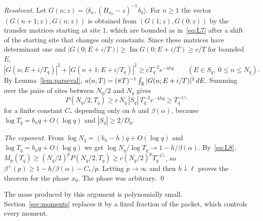 \emph{Resolvent.} Let $G(n;z)=\langle\delta_n,(H_{x_0}-z)^{-1}\delta_0\rangle$. For $n\ge1$ the vector $(G(n+1;z),G(n;z))$ is obtained from $(G(1;z),G(0;z))$ by the transfer matrices starting at site $1$, which are bounded as in~\eqref{eq:L7} after a shift of the starting site that changes only constants. Since these matrices have determinant one and $|G(0;E+i/T)|\ge\operatorname{Im}G(0;E+i/T)\ge c/T$ for bounded $E$,
\[
|G(n;E+i/T_q)|^2+|G(n+1;E+i/T_q)|^2\ge cT_q^{-2}e^{-4hq}\qquad(E\in S_q,\ 0\le n\le N_q).
\]
By Lemma~\ref{lem:parseval}, $a(n,T)=(\pi T)^{-1}\int_\mathbb R|G(n;E+i/T)|^2\,dE$. Summing over the pairs of sites between $N_q/2$ and $N_q$ gives
\begin{equation}\label{eq:L8}
P(N_q/2,T_q)\ge c\,N_q\,|S_q|\,T_q^{-3}e^{-4hq}\ge T_q^{-C_*}
\end{equation}
for a finite constant $C_*$ depending only on $h$ and $\beta(\alpha)$, because $\log T_q=b_nq+O(\log q)$ and $|S_q|\ge2/D_q$.

\emph{The exponent.} From $\log N_q=(b_n-h)q+O(\log q)$ and $\log T_q=b_nq+O(\log q)$ we get $\log N_q/\log T_q\to1-h/\beta(\alpha)$. By~\eqref{eq:L8}, $M_p(T_q)\ge(N_q/2)^pP(N_q/2,T_q)\ge c(N_q/2)^pT_q^{-C_*}$, so $\beta^+(p)\ge1-h/\beta(\alpha)-C_*/p$. Letting $p\to\infty$ and then $h\downarrow\ell$ proves the theorem for the phase $x_0$. The phase was arbitrary.
\qed

The mass produced by this argument is polynomially small. Section~\ref{sec:moments} replaces it by a fixed fraction of the packet, which controls every moment.

